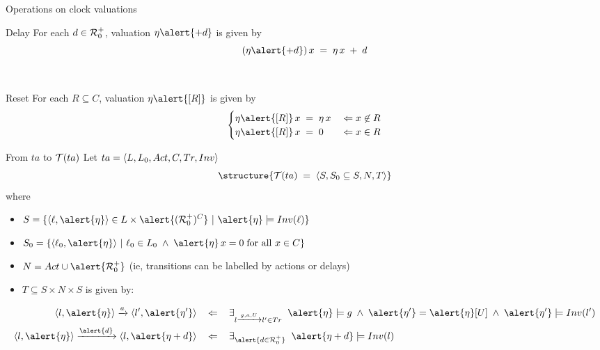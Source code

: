 \documentclass[aspectratio=169]{beamer}
\begin{document}
\begin{slide}{Operations on clock valuations}
\small


\begin{block}{Delay}
For each $d \in \mathcal{R}_0^+$, valuation $\eta \alert{+ d}$ is given by
\begin{equation*}
(\eta \alert{+ d})\, x\; =\; \eta\, x\; +\; d
\end{equation*}
\end{block}
~\\

\begin{block}{Reset}
For each $R \subseteq C$, valuation $\eta\alert{[R]}$ is given by
\begin{equation*}
\begin{cases}
\eta\alert{[R]}\, x\; =\; \eta\, x & \; \rimp\; x \not\in R\\
\eta\alert{[R]}\, x\; =\; 0 & \; \rimp\; x \in R
\end{cases}
\end{equation*}
\end{block}
\end{slide}

\begin{slide}{From $ta$ to $\mathcal{T}(ta)$}
\small
Let $ta = \langle L, L_0, Act, C, Tr, Inv \rangle$
\begin{equation*}
 \structure{\TL{ta}\; =\; \pair{S, S_0 \subseteq S, N, T}}
\end{equation*}
where
\begin{itemize}
\item $S = \enset{\pair{\ell,\alert{\eta}} \in  L \times \alert{(\R_0^+)^C}~|~\alert{\eta} \models Inv(\ell)}$
\item $S_0 = \enset{\pair{\ell_0,\alert{\eta}}~|~\ell_0 \in L_0\; \land\;  \alert{\eta}\, x = 0\; \text{for all $x \in C$}}$
\item $N = Act \cup \alert{\R_0^+}$ (ie, \alert{transitions can be labelled by actions or delays})
\item $T \subseteq S \times N \times S$ is given by:
\end{itemize}
\begin{align*}
\pair{l,\alert{\eta}} \trans{a} \pair{l',\alert{\eta'}}\; & ~~\rimp~~\; 
\exists_{l \trans{g,a,U} l' \in Tr}  \; \;\alert{\eta} \models g \; \land\; \alert{\eta'} = \alert{\eta}[U] \; \land\;  \alert{\eta'} \models Inv(l')\\
\pair{l,\alert{\eta}} \trans{\alert{d}} \pair{l,\alert{\eta +d}}\; & ~~\rimp~~\; 
\exists_{\alert{d \in \R_0^+}}  \; \;  \alert{\eta + d} \models Inv(l)
\end{align*}
\end{slide}
\end{document}
